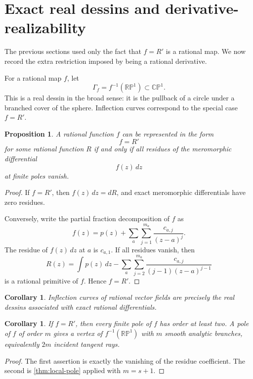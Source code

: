 \documentclass[11pt,reqno]{amsart}
\newtheorem{proposition}[theorem]{Proposition}
\newtheorem{corollary}[theorem]{Corollary}
\theoremstyle{definition}
\theoremstyle{remark}
\newcommand{\CP}{\mathbb {CP}}
\newcommand{\RP}{\mathbb {RP}}
\begin{document}
\section{Exact real dessins and derivative-realizability}

The previous sections used only the fact that $f=R'$ is a rational map.  We now record the extra restriction imposed by being a rational derivative.

For a rational map $f$, let
\[
        \Gamma_f=f^{-1}(\RP^1)\subset \CP^1.
\]
This is a real dessin in the broad sense: it is the pullback of a circle under a branched cover of the sphere.  Inflection curves correspond to the special case $f=R'$.

\begin{proposition}\label{prop:exact}
A rational function $f$ can be represented in the form
\[
        f=R'
\]
for some rational function $R$ if and only if all residues of the meromorphic differential
\[
        f(z)\,dz
\]
at finite poles vanish.
\end{proposition}

\begin{proof}
If $f=R'$, then $f(z)\,dz=dR$, and exact meromorphic differentials have zero residues.

Conversely, write the partial fraction decomposition of $f$ as
\[
        f(z)=p(z)+\sum_{a}\sum_{j=1}^{m_a}\frac{c_{a,j}}{(z-a)^j}.
\]
The residue of $f(z)\,dz$ at $a$ is $c_{a,1}$.  If all residues vanish, then
\[
        R(z)=\int p(z)\,dz-
        \sum_a\sum_{j=2}^{m_a}\frac{c_{a,j}}{(j-1)(z-a)^{j-1}}
\]
is a rational primitive of $f$.  Hence $f=R'$.
\end{proof}

\begin{corollary}\label{cor:exact-dessins}
Inflection curves of rational vector fields are precisely the real dessins associated with exact rational differentials.
\end{corollary}

\begin{corollary}\label{cor:pole-restriction}
If $f=R'$, then every finite pole of $f$ has order at least two.  A pole of $f$ of order $m$ gives a vertex of $f^{-1}(\RP^1)$ with $m$ smooth analytic branches, equivalently $2m$ incident tangent rays.
\end{corollary}

\begin{proof}
The first assertion is exactly the vanishing of the residue coefficient.  The second is \cref{thm:local-pole} applied with $m=s+1$.
\end{proof}
\end{document}
